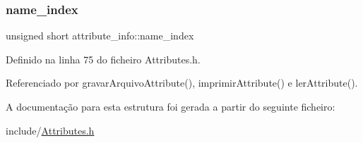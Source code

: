 \subsubsection{\texorpdfstring{name\+\_\+index}{name\_index}}
{\footnotesize\ttfamily unsigned short attribute\+\_\+info\+::name\+\_\+index}



Definido na linha 75 do ficheiro Attributes.\+h.



Referenciado por gravar\+Arquivo\+Attribute(), imprimir\+Attribute() e ler\+Attribute().



A documentação para esta estrutura foi gerada a partir do seguinte ficheiro\+:\begin{DoxyCompactItemize}
\item 
include/\hyperlink{Attributes_8h}{Attributes.\+h}\end{DoxyCompactItemize}
